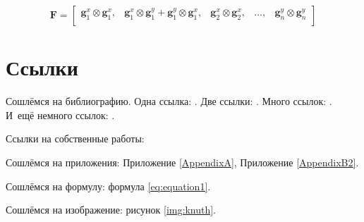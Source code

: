 \begin{equation}
    \mathbf{F} = 
    \begin{bmatrix}
        \mathbf{g}_1^x \otimes \mathbf{g}_1^x, &
        \mathbf{g}_1^x \otimes \mathbf{g}_1^y + \mathbf{g}_1^y \otimes \mathbf{g}_1^x, &
        \mathbf{g}_2^x \otimes \mathbf{g}_2^x, &
        \dots, & \mathbf{g}_n^y \otimes \mathbf{g}_n^y \\
    \end{bmatrix}
\end{equation} 


\section{Ссылки} \label{sect1_2}
Сошлёмся на библиографию.
Одна ссылка: \cite[с.~54]{Sokolov}\cite[с.~36]{Gaidaenko}.
Две ссылки: \cite{Sokolov,Gaidaenko}.
Много ссылок: %
\cite{Lermontov,Management,Borozda,Marketing,Constitution,FamilyCode,Gost.7.0.53,Razumovski,Lagkueva,Pokrovski,Sirotko,Lukina,Methodology,Encyclopedia,Nasirova,Berestova,Kriger}.
И~ещё немного ссылок:
\cite{Article,Book,Booklet,Conference,Inbook,Incollection,Manual,Mastersthesis,Misc,Phdthesis,Proceedings,Techreport,Unpublished}.
\cite{medvedev2006jelektronnye, CEAT:CEAT581, doi:10.1080/01932691.2010.513279,Gosele1999161,Li2007StressAnalysis, Shoji199895,test:eisner-sample,AB_patent_Pomerantz_1968,iofis_patent1960}



Ссылки на собственные работы:~\cite{vakbib1, confbib1}

Сошлёмся на приложения: Приложение \ref{AppendixA}, Приложение \ref{AppendixB2}.

Сошлёмся на формулу: формула \eqref{eq:equation1}.

Сошлёмся на изображение: рисунок \ref{img:knuth}.

